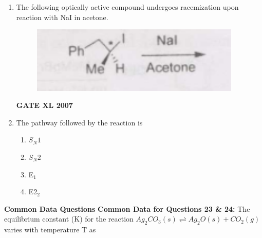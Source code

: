 \documentclass[journal,12pt,onecolumn]{IEEEtran}
\begin{document}
\begin{enumerate}[resume]
    \item The following optically active compound undergoes racemization upon reaction with NaI in acetone. 
    \begin{figure}[h!]
	\centering
	\includegraphics[width=10cm]{22}
	\caption*{}
	\label{fig:Q22}
	\end{figure} 
	    \hfill \textbf{GATE XL 2007}

    \item The pathway followed by the reaction is
	    
    \begin{multicols}{4}
        \begin{enumerate} 
            \item $S_{N}1$
            \item $S_{N}2$
            \item E$_1$
            \item E2$_2$
        \end{enumerate}
    \end{multicols}
\end{enumerate}

\textbf{Common Data Questions}
\noindent\textbf{Common Data for Questions 23 \& 24:}
The equilibrium constant (K) for the reaction $Ag_{2}CO_{3} (s) \rightleftharpoons Ag_{2}O (s) + CO_{2} (g)$ varies with temperature T as

\end{document}
